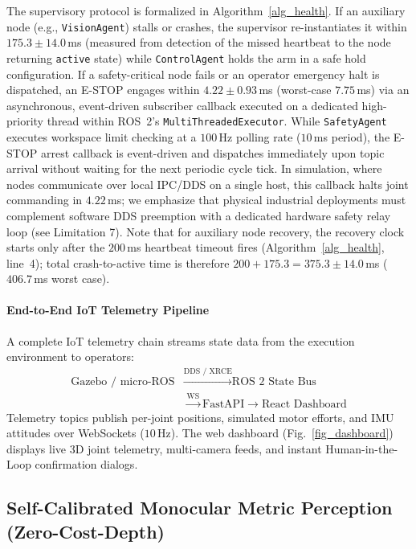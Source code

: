 \documentclass[journal]{IEEEtran}
\begin{document}
The supervisory protocol is formalized in Algorithm~\ref{alg_health}. If an auxiliary node (e.g., \texttt{VisionAgent}) stalls or crashes, the supervisor re-instantiates it within $175.3 \pm 14.0$\,ms (measured from detection of the missed heartbeat to the node returning \texttt{active} state) while \texttt{ControlAgent} holds the arm in a safe hold configuration. If a safety-critical node fails or an operator emergency halt is dispatched, an E-STOP engages within $4.22 \pm 0.93$\,ms (worst-case $7.75$\,ms) via an asynchronous, event-driven subscriber callback executed on a dedicated high-priority thread within ROS~2's \texttt{MultiThreadedExecutor}. While \texttt{SafetyAgent} executes workspace limit checking at a $100$\,Hz polling rate ($10$\,ms period), the E-STOP arrest callback is event-driven and dispatches immediately upon topic arrival without waiting for the next periodic cycle tick. In simulation, where nodes communicate over local IPC/DDS on a single host, this callback halts joint commanding in $4.22$\,ms; we emphasize that physical industrial deployments must complement software DDS preemption with a dedicated hardware safety relay loop (see Limitation 7). Note that for auxiliary node recovery, the recovery clock starts only after the $200$\,ms heartbeat timeout fires (Algorithm~\ref{alg_health}, line~4); total crash-to-active time is therefore $200 + 175.3 = 375.3 \pm 14.0$\,ms ($406.7$\,ms worst case).

\paragraph{End-to-End IoT Telemetry Pipeline}
A complete IoT telemetry chain streams state data from the execution environment to operators:
\begin{align}
\text{Gazebo / micro-ROS} &\xrightarrow{\text{DDS / XRCE}} \text{ROS~2 State Bus} \nonumber \\
&\xrightarrow{\text{WS}} \text{FastAPI} \xrightarrow{} \text{React Dashboard}
\end{align}
Telemetry topics publish per-joint positions, simulated motor efforts, and IMU attitudes over WebSockets ($10$\,Hz). The web dashboard (Fig.~\ref{fig_dashboard}) displays live 3D joint telemetry, multi-camera feeds, and instant Human-in-the-Loop confirmation dialogs.

\subsection{Self-Calibrated Monocular Metric Perception (Zero-Cost-Depth)}
\label{sec_perception}
\end{document}

